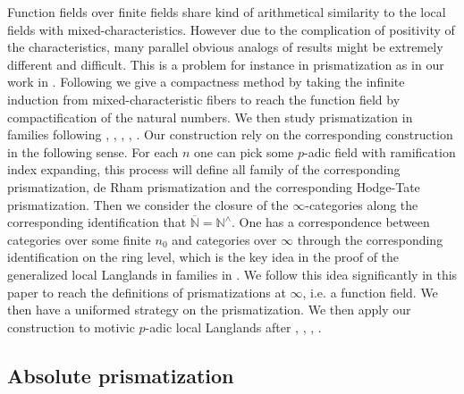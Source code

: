 \documentclass[12pt]{article}
\theoremstyle{definition}
\begin{document}
\indent Function fields over finite fields share kind of arithmetical similarity to the local fields with mixed-characteristics. However due to the complication of positivity of the characteristics, many parallel obvious analogs of results might be extremely different and difficult. This is a problem for instance in prismatization as in our work in \cite{2T1}. Following \cite{2LH} we give a compactness method by taking the infinite induction from mixed-characteristic fibers to reach the function field by compactification of the natural numbers. We then study prismatization in families following \cite{2G}, \cite{2BS}, \cite{2BL}, \cite{2D}, \cite{2BL2}. Our construction rely on the corresponding construction in the following sense. For each $n$ one can pick some $p$-adic field with ramification index expanding, this process will define all family of the corresponding prismatization, de Rham prismatization and the corresponding Hodge-Tate prismatization. Then we consider the closure of the $\infty$-categories along the corresponding identification that $\overline{\mathbb{N}}= \mathbb{N}^\wedge$. One has a correspondence between categories over some finite $n_0$ and categories over $\infty$ through the corresponding identification on the ring level, which is the key idea in the proof of the generalized local Langlands in families in \cite{2LH}. We follow this idea significantly in this paper to reach the definitions of prismatizations at $\infty$, i.e. a function field. We then have a uniformed strategy on the prismatization. We then apply our construction to motivic $p$-adic local Langlands after \cite{1S5}, \cite{1S6}, \cite{1RS}, \cite{1FS}.







\subsection{Absolute prismatization}
\end{document}
